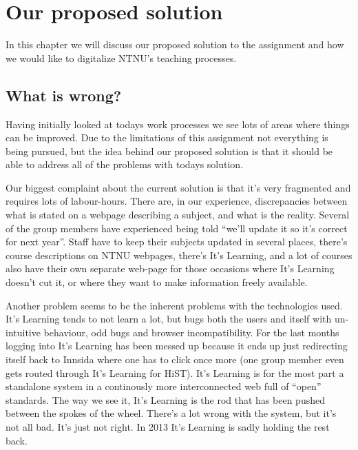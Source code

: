 \section{Our proposed solution}

In this chapter we will discuss our proposed solution to the assignment and how we would like to digitalize NTNU's teaching processes. 

\subsection{What is wrong?}
Having initially looked at todays work processes we see lots of areas where things can be improved. Due to the limitations of this assignment not everything
is being pursued, but the idea behind our proposed solution is that it should be able to address all of the problems with todays solution. 

\noindent
Our biggest complaint about the current solution is that it's very fragmented and requires lots of labour-hours. There are, in our experience, discrepancies between what is 
stated on a webpage describing a subject, and what is the reality. Several of the group members have experienced being told ``we'll update it so it's correct for next year''. 
Staff have to keep their subjects updated in several places, there's course descriptions on NTNU webpages, there's It's Learning, and a lot of courses also have their own separate
web-page for those occasions where It's Learning doesn't cut it, or where they want to make information freely available. 

\noindent
Another problem seems to be the inherent problems with the technologies used. It's Learning tends to not learn a lot, but bugs both the users and itself with un-intuitive behaviour, 
odd bugs and browser incompatibility. For the last months logging into It's Learning has been messed up because it ends up just redirecting itself back to Innsida where one has to 
click once more (one group member even gets routed through It's Learning for HiST). It's Learning is for the most part a standalone system in a continously more interconnected web full of ``open'' standards. The way we see it, It's Learning is the 
rod that has been pushed between the spokes of the wheel. There's a lot wrong with the system, but it's not all bad. It's just not right. In 2013 It's Learning is sadly holding the 
rest back. 

